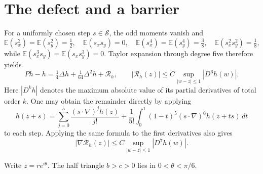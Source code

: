 \documentclass[11pt]{article}
\newcommand{\Sset}{\mathcal S}
\begin{document}
\section{The defect and a barrier}

For a uniformly chosen step $s\in\Sset$, the odd moments vanish and
\[
 \mathbb E(s_x^2)=\mathbb E(s_y^2)=\tfrac12,\quad
 \mathbb E(s_xs_y)=0,
 \quad \mathbb E(s_x^4)=\mathbb E(s_y^4)=\tfrac38,
 \quad \mathbb E(s_x^2s_y^2)=\tfrac18,
\]
while $\mathbb E(s_x^3s_y)=\mathbb E(s_xs_y^3)=0$.
Taylor expansion through degree five therefore yields
\begin{equation}\label{eq:taylor}
 Ph-h=\tfrac14\Delta h+\tfrac1{64}\Delta^2h+\mathcal R_h,
 \qquad |\mathcal R_h(z)|\le C\sup_{|w-z|\le1}|D^6h(w)|.
\end{equation}
Here $|D^k h|$ denotes the maximum absolute value of its partial derivatives
of total order $k$. One may obtain the remainder directly by applying
\[
 h(z+s)=\sum_{j=0}^5\frac{(s\cdot\nabla)^j h(z)}{j!}
 +\frac1{5!}\int_0^1(1-t)^5(s\cdot\nabla)^6h(z+ts)\,dt
\]
to each step. Applying the same formula to the first derivatives also gives
\[
 |\nabla\mathcal R_h(z)|\le C\sup_{|w-z|\le1}|D^7h(w)|.
\]

Write $z=re^{i\theta}$. The half triangle $b>c>0$ lies in
$0<\theta<\pi/6$.
\end{document}
